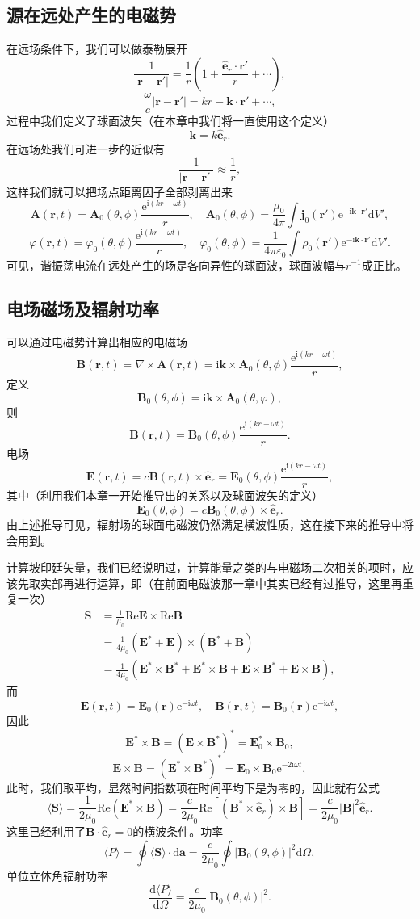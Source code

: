 \documentclass[UTF8]{ctexbook}
\newcommand{\e}{\mathrm{e}}
\renewcommand{\d}{\mathrm{d}}
\renewcommand{\b}{\boldsymbol}
\renewcommand{\i}{\mathrm{i}}
\renewcommand{\Re}{\mathrm{Re}}
\renewcommand{\k}{\frac{1}{4\pi\varepsilon_0}}
\numberwithin{equation}{chapter}
\begin{document}
	\subsection{源在远处产生的电磁势}
	在远场条件下，我们可以做泰勒展开
	\[\frac{1}{|\b{r}-\b{r'}|}=\frac{1}{r}\left(1+\frac{\hat{\b{e}}_r\cdot\b{r}'}{r}+\cdots\right),\]
	\[\frac{\omega}{c}|\b{r}-\b{r}'|=kr-\b{k}\cdot\b{r}'+\cdots,\]
	过程中我们定义了球面波矢（在本章中我们将一直使用这个定义）
	\[\b{k}=k\hat{\b{e}}_{r}.\]
	在远场处我们可进一步的近似有
	\[\frac{1}{|\b{r}-\b{r}'|}\approx \frac{1}{r},\]
	这样我们就可以把场点距离因子全部剥离出来
	\[\b{A}(\b{r},t)=\b{A}_0(\theta,\phi)\frac{\e^{\i(kr-\omega t)}}{r},\quad \b{A}_0(\theta,\phi)=\frac{\mu_0}{4\pi}\int \b{j}_0(\b{r}')\e^{-\i\b{k}\cdot\b{r}'}\d V',\]
	\[\varphi(\b{r},t)=\varphi_0(\theta,\phi)\frac{\e^{\i(kr-\omega t)}}{r},\quad \varphi_0(\theta,\phi)=\k\int\rho_0(\b{r}')\e^{-\i\b{k}\cdot\b{r}'}\d V'.\]
	可见，谐振荡电流在远处产生的场是各向异性的球面波，球面波幅与$r^{-1}$成正比。
	
	\subsection{电场磁场及辐射功率}
	可以通过电磁势计算出相应的电磁场
	\[\b{B}(\b{r},t)=\nabla\times\b{A}(\b{r},t)=\i\b{k}\times\b{A}_0(\theta,\phi)\frac{\e^{\i(kr-\omega t)}}{r},\]
	定义
	\[\b{B}_0(\theta,\phi)=\i\b{k}\times\b{A}_0(\theta,\varphi),\]
	则
	\[\b{B}(\b{r},t)=\b{B}_0(\theta,\phi)\frac{\e^{\i(kr-\omega t)}}{r}.\]
	电场
	\[\b{E}(\b{r},t)=c\b{B}(\b{r},t)\times\hat{\b{e}}_r=\b{E}_0(\theta,\phi)\frac{\e^{\i(kr-\omega t)}}{r},\]
	其中（利用我们本章一开始推导出的关系以及球面波矢的定义）
	\[\b{E}_0(\theta,\phi)=c\b{B}_0(\theta,\phi)\times\hat{\b{e}}_r.\]
	由上述推导可见，辐射场的球面电磁波仍然满足横波性质，这在接下来的推导中将会用到。
	
	计算坡印廷矢量，我们已经说明过，计算能量之类的与电磁场二次相关的项时，应该先取实部再进行运算，即（在前面电磁波那一章中其实已经有过推导，这里再重复一次）
	\begin{align*}
		\b{S}&=\frac{1}{\mu_0}\Re \b{E} \times \Re \b{B} \\
		&=\frac{1}{4\mu_0}(\b{E}^*+\b{E})\times(\b{B}^*+\b{B}) \\
		&=\frac{1}{4\mu_0}(\b{E}^*\times\b{B}^*+\b{E}^*\times\b{B}+\b{E}\times\b{B}^*+\b{E}\times\b{B}),	
	\end{align*}
	而
	\[\b{E}(\b{r},t)=\b{E}_0(\b{r})\e^{-\i\omega t},\quad \b{B}(\b{r},t)=\b{B}_0(\b{r})\e^{-\i\omega t},\]
	因此
	\[\b{E}^*\times\b{B}=(\b{E}\times\b{B}^*)^*=\b{E}_0^*\times\b{B}_0,\]
	\[\b{E}\times\b{B}=(\b{E}^*\times\b{B}^*)^*=\b{E}_0\times\b{B}_0\e^{-2\i\omega t},\]
	此时，我们取平均，显然时间指数项在时间平均下是为零的，因此就有公式
	\[\langle \b{S}\rangle =\frac{1}{2\mu_0}\Re(\b{E}^*\times\b{B})=\frac{c}{2\mu_0}\Re\left[(\b{B}^*\times\hat{\b{e}}_r)\times\b{B}\right]=\frac{c}{2\mu_0}|\b{B}|^2\hat{\b{e}}_r.\]
	这里已经利用了$\b{B}\cdot\hat{\b{e}}_r=0$的横波条件。功率
	\[\langle P\rangle=\oint \langle \b{S}\rangle\cdot\d\b{a}=\frac{c}{2\mu_0}\oint|\b{B}_0(\theta,\phi)|^2\d \Omega,\]
	单位立体角辐射功率
	\[\frac{\d\langle P\rangle}{\d \Omega}=\frac{c}{2\mu_0}|\b{B}_0(\theta,\phi)|^2.\]
	
\end{document}
